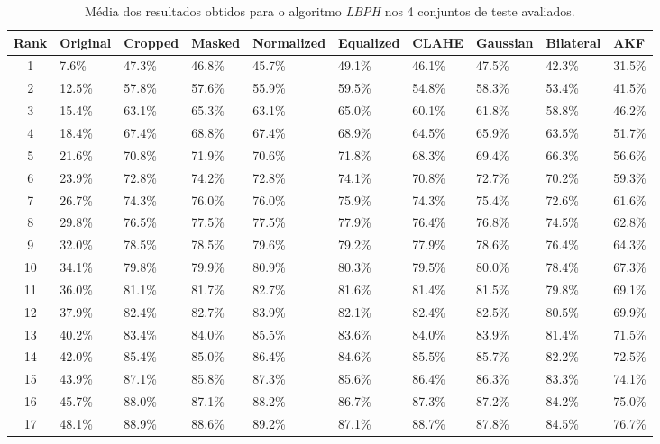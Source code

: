 \begin{table}[h]
    \begin{center}
    \caption{Média dos resultados obtidos para o algoritmo \textit{LBPH} nos 4 conjuntos de teste avaliados.}	
	\begin{tabular}{c|p{1.2cm}p{1.1cm}p{1.1cm}p{1.7cm}p{1.5cm}p{1.2cm}p{1.2cm}p{1.2cm}p{1.2cm}}
	Rank & Original & Cropped & Masked & Normalized & Equalized & CLAHE & Gaussian & Bilateral & AKF\\ 
	\hline\hline
	1 & 7.6\% & 47.3\% & 46.8\% & 45.7\% & 49.1\% & 46.1\% & 47.5\% & 42.3\% & 31.5\% \\ 
	2 & 12.5\% & 57.8\% & 57.6\% & 55.9\% & 59.5\% & 54.8\% & 58.3\% & 53.4\% & 41.5\% \\ 
	3 & 15.4\% & 63.1\% & 65.3\% & 63.1\% & 65.0\% & 60.1\% & 61.8\% & 58.8\% & 46.2\% \\ 
	4 & 18.4\% & 67.4\% & 68.8\% & 67.4\% & 68.9\% & 64.5\% & 65.9\% & 63.5\% & 51.7\% \\ 
	5 & 21.6\% & 70.8\% & 71.9\% & 70.6\% & 71.8\% & 68.3\% & 69.4\% & 66.3\% & 56.6\% \\ 
	6 & 23.9\% & 72.8\% & 74.2\% & 72.8\% & 74.1\% & 70.8\% & 72.7\% & 70.2\% & 59.3\% \\ 
	7 & 26.7\% & 74.3\% & 76.0\% & 76.0\% & 75.9\% & 74.3\% & 75.4\% & 72.6\% & 61.6\% \\ 
	8 & 29.8\% & 76.5\% & 77.5\% & 77.5\% & 77.9\% & 76.4\% & 76.8\% & 74.5\% & 62.8\% \\ 
	9 & 32.0\% & 78.5\% & 78.5\% & 79.6\% & 79.2\% & 77.9\% & 78.6\% & 76.4\% & 64.3\% \\ 
	10 & 34.1\% & 79.8\% & 79.9\% & 80.9\% & 80.3\% & 79.5\% & 80.0\% & 78.4\% & 67.3\% \\ 
	11 & 36.0\% & 81.1\% & 81.7\% & 82.7\% & 81.6\% & 81.4\% & 81.5\% & 79.8\% & 69.1\% \\ 
	12 & 37.9\% & 82.4\% & 82.7\% & 83.9\% & 82.1\% & 82.4\% & 82.5\% & 80.5\% & 69.9\% \\ 
	13 & 40.2\% & 83.4\% & 84.0\% & 85.5\% & 83.6\% & 84.0\% & 83.9\% & 81.4\% & 71.5\% \\ 
	14 & 42.0\% & 85.4\% & 85.0\% & 86.4\% & 84.6\% & 85.5\% & 85.7\% & 82.2\% & 72.5\% \\ 
	15 & 43.9\% & 87.1\% & 85.8\% & 87.3\% & 85.6\% & 86.4\% & 86.3\% & 83.3\% & 74.1\% \\ 
	16 & 45.7\% & 88.0\% & 87.1\% & 88.2\% & 86.7\% & 87.3\% & 87.2\% & 84.2\% & 75.0\% \\ 
	17 & 48.1\% & 88.9\% & 88.6\% & 89.2\% & 87.1\% & 88.7\% & 87.8\% & 84.5\% & 76.7\% \\ 

\end{tabular}
\end{center}
\end{table}
